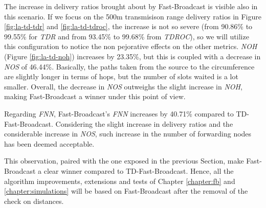 		The increase in delivery ratios brought about by Fast-Broadcast is visible also in this scenario. If we focus on the 500m transmisison range delivery ratios in Figure \ref{fig:la-td-tdr} and \ref{fig:la-td-tdroc}, the increase is not so severe (from 90.86\% to 99.55\% for \textit{TDR} and from 93.45\% to 99.68\% from \textit{TDROC}), so we will utilize this configuration to notice the non pejorative effects on the other metrics.
		\textit{NOH} (Figure \ref{fig:la-td-noh}) increases by 23.35\%, but this is coupled with a decrease in \textit{NOS} of 46.44\%. Basically, the paths taken from the source to the circumference are slightly longer in terms of hops, but the number of slots waited is a lot smaller. Overall, the decrease in \textit{NOS} outweighs the slight increase in \textit{NOH}, making Fast-Broadcast a winner under this point of view.
		
		
		Regarding \textit{FNN}, Fast-Broadcast's \textit{FNN} increases by 40.71\% compared to TD-Fast-Broadcast. Considering the slight increase in delivery ratios and the considerable increase in \textit{NOS}, such increase in the number of forwarding nodes has been deemed acceptable. 
		
		
		This observation, paired with the one exposed in the previous Section, make Fast-Broadcast a clear winner compared to TD-Fast-Broadcast. Hence, all the algorithm improvements, extensions and tests of Chapter \ref{chapter:fb} and \ref{chapter:simulations} will be based on Fast-Broadcast after the removal of the check on distances.
		
		